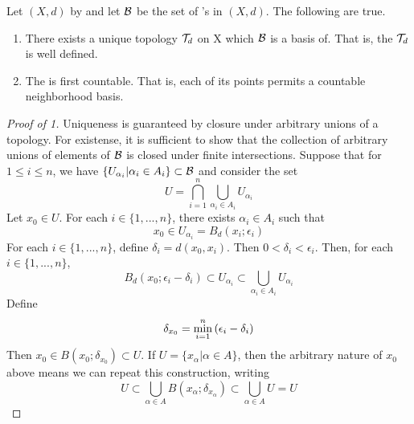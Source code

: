 \label{prop:pseudometrictopology}
\begin{prop}
    Let $(X,d)$ by  \PseudometricSpace and let $\mathcal{B}$ be the set of \OpenBall's in $(X,d)$. 
    The following are true. 
    \begin{enumerate}
        \item There exists a unique topology $\mathcal{T}_d$ on X which $\mathcal{B}$ is a basis of. That is, the \PseudometricTopology $\mathcal{T}_d$ is well defined. 
        \item The \PseudometricInducedTopology is first countable. That is, each of its points permits a countable neighborhood basis. 
    \end{enumerate}
    \begin{proof}[Proof of 1]
        Uniqueness is guaranteed by closure under arbitrary unions of a topology. 
        For existense, it is sufficient to show that the collection of arbitrary unions
        of elements of $\mathcal{B}$ is closed under finite intersections. 
        Suppose that for $1\leq i \leq n$, we have $\{U_{\alpha_i} | \alpha_i \in A_i\} \subset \mathcal{B}$
        and consider the set
        \begin{equation}
            U=\bigcap_{i=1}^n \bigcup_{\alpha_i \in A_i} U_{\alpha_i}
        \end{equation}
        Let $x_0 \in U$. 
        For each $i \in \{1, ..., n\}$, there exists $\alpha_i \in A_i$ such that 
        \begin{equation}
            x_0 \in U_{\alpha_i} = B_d(x_i; \epsilon_i)
        \end{equation}
        For each $i \in \{1, ..., n \}$, define $\delta_i = d(x_0, x_i)$. Then $0 < \delta_i < \epsilon_i$. 
        Then, for each $i \in \{1, ..., n \}$, 
        \begin{equation}
            B_d(x_0; \epsilon_i-\delta_i) \subset U_{\alpha_i} \subset \bigcup_{\alpha_i \in A_i} U_{\alpha_i}
        \end{equation}
        Define 
        \begin{equation}
            \delta_{x_0} = \min\limits_{i=1}^n \left(  \epsilon_i-\delta_i\right)
        \end{equation}
        Then $x_0 \in B(x_0; \delta_{x_0} ) \subset U$. 
        If $U=\{x_{\alpha} | \alpha \in A\}$, then the arbitrary nature of $x_0$ above means 
        we can repeat this construction, writing 
        \begin{equation}
            U \subset \bigcup_{\alpha \in A} B(x_{\alpha} ; \delta_{x_{\alpha}} )\subset \bigcup_{\alpha \in A} U = U

\end{equation}
\end{proof}
\end{prop}
